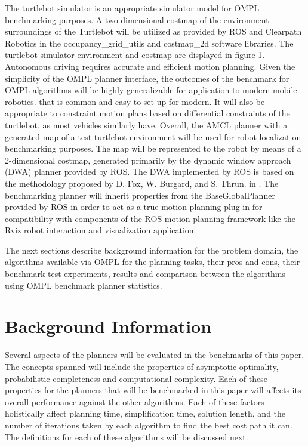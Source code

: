 \documentclass[conference]{IEEEtran} \usepackage[T1]{fontenc} \usepackage[backend=biber, style=ieee]{biblatex}
\begin{document}
The turtlebot simulator is an appropriate simulator model for OMPL benchmarking purposes. A two-dimensional costmap of the environment surroundings of the Turtlebot
will be utilized as provided by ROS and Clearpath Robotics in the occupancy\_grid\_utils and costmap\_2d software libraries. The turtlebot simulator environment and costmap 
are displayed in figure 1. Autonomous driving requires accurate and efficient motion planning. Given the simplicity of the OMPL planner interface, the outcomes of the benchmark
for OMPL algorithms will be highly generalizable for application to modern mobile robotics. that is common and easy to set-up for modern. It will also be appropriate to constraint motion plans based on differential constraints of the turtlebot, as most vehicles similarly have. Overall, the 
AMCL planner with a generated map of a test turtlebot environment will be used for robot localization benchmarking purposes. The map will be represented to the robot by 
means of a 2-dimensional costmap, generated primarily by the dynamic window approach (DWA) planner provided by ROS. The DWA implemented by ROS is based on the 
methodology proposed by D. Fox, W. Burgard, and S. Thrun. in \cite{dwa}. The benchmarking planner will inherit properties from the BaseGlobalPlanner provided by ROS in 
order to act as a true motion planning plug-in for compatibility with components of the ROS motion planning framework like the Rviz robot interaction and visualization 
application.

The next sections describe background information for the problem domain, the algorithms available via OMPL for the planning tasks, their pros and cons, their benchmark 
test experiments, results and comparison between the algorithms using OMPL benchmark planner statistics.

\section{Background Information} \label{Background Information}

Several aspects of the planners will be evaluated in the benchmarks of this paper. The concepts spanned will include the properties of asymptotic optimality, probabilistic 
completeness and computational complexity. Each of these properties for the planners that will be benchmarked in this paper will affects its overall performance against
the other algorithms. Each of these factors holistically affect planning time, simplification time, solution length, and the number of iterations
taken by each algorithm to find the best cost path it can. The definitions for each of these algorithms will be discussed next.
\end{document}
